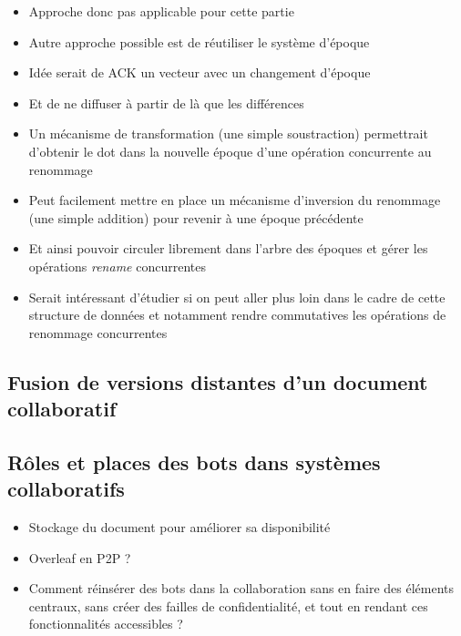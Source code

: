 \documentclass[12pt]{thesul}
\begin{document}
\begin{itemize}
  \item Approche donc pas applicable pour cette partie
  \item Autre approche possible est de réutiliser le système d'époque
  \item Idée serait de ACK un vecteur avec un changement d'époque
  \item Et de ne diffuser à partir de là que les différences
  \item Un mécanisme de transformation (une simple soustraction) permettrait d'obtenir le dot dans la nouvelle époque d'une opération concurrente au renommage
  \item Peut facilement mettre en place un mécanisme d'inversion du renommage (une simple addition) pour revenir à une époque précédente
  \item Et ainsi pouvoir circuler librement dans l'arbre des époques et gérer les opérations \emph{rename} concurrentes
  \item Serait intéressant d'étudier si on peut aller plus loin dans le cadre de cette structure de données et notamment rendre commutatives les opérations de renommage concurrentes
\end{itemize}

\subsection{Fusion de versions distantes d'un document collaboratif}

\subsection{Rôles et places des bots dans systèmes collaboratifs}
\begin{itemize}
  \item Stockage du document pour améliorer sa disponibilité
  \item Overleaf en P2P ?
  \item Comment réinsérer des bots dans la collaboration sans en faire des éléments centraux, sans créer des failles de confidentialité, et tout en rendant ces fonctionnalités accessibles ?
\end{itemize}

% 

% 

\label{app:rename-id}
\end{document}
